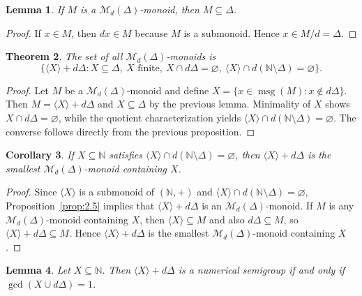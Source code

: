 \documentclass[12pt,a4paper]{amsart}
\newtheorem{theorem}{Theorem}[section]
\newtheorem{lemma}[theorem]{Lemma}
\newtheorem{corollary}[theorem]{Corollary}
\theoremstyle{definition}
\theoremstyle{remark}
\begin{document}
\begin{lemma}
If $M$ is a $\mathcal{M}_d(\Delta)$-monoid, then $M\subseteq \Delta$.
\end{lemma}

\begin{proof}
If $x\in M$, then $dx\in M$ because $M$ is a submonoid. Hence $x\in M/d=\Delta$.
\end{proof}

\begin{theorem}\label{th:2.8}
The set of all $\mathcal{M}_d(\Delta)$-monoids is
\[
\{\langle X \rangle + d\Delta : X\subseteq \Delta,\ X \text{ finite},\ X\cap d\Delta=\varnothing,
\ \langle X \rangle\cap d(\mathbb{N}\setminus \Delta)=\varnothing\}.
\]
\end{theorem}

\begin{proof}
Let $M$ be a $\mathcal{M}_d(\Delta)$-monoid and define
$X=\{x\in \operatorname{msg}(M): x\notin d\Delta\}$. Then $M=\langle X \rangle+d\Delta$ and $X\subseteq \Delta$ by the previous lemma.
Minimality of $X$ shows $X\cap d\Delta=\varnothing$, while the quotient characterization yields
$\langle X \rangle\cap d(\mathbb{N}\setminus \Delta)=\varnothing$. The converse follows directly from the previous proposition.
\end{proof}

\begin{corollary}\label{cor:2.9}
If $X\subseteq \mathbb{N}$ satisfies $\langle X \rangle\cap d(\mathbb{N}\setminus \Delta)=\varnothing$, then $\langle X \rangle+d\Delta$ is the smallest $\mathcal{M}_d(\Delta)$-monoid containing $X$.
\end{corollary}

\begin{proof}
Since $\langle X \rangle$ is a submonoid of $(\mathbb{N},+)$ and
$\langle X \rangle\cap d(\mathbb{N}\setminus \Delta)=\varnothing$, Proposition~\ref{prop:2.5}
implies that $\langle X \rangle+d\Delta$ is an $\mathcal{M}_d(\Delta)$-monoid. If $M$ is any
$\mathcal{M}_d(\Delta)$-monoid containing $X$, then $\langle X \rangle\subseteq M$ and also
$d\Delta\subseteq M$, so $\langle X \rangle+d\Delta\subseteq M$. Hence $\langle X \rangle+d\Delta$ is
the smallest $\mathcal{M}_d(\Delta)$-monoid containing $X$.
\end{proof}

\begin{lemma}\label{lem:2.10}
Let $X\subseteq \mathbb{N}$. Then $\langle X \rangle+d\Delta$ is a numerical semigroup if and only if
$\operatorname{gcd}(X\cup d\Delta)=1$.
\end{lemma}
\end{document}
